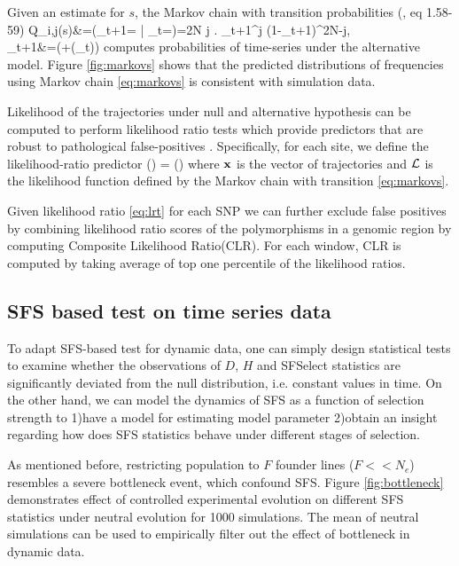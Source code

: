 \documentclass[11pt]{article}
\begin{document}
Given an estimate for $s$, the Markov chain with transition 
probabilities 
(\cite{Ewens2012Mathematical}, eq 1.58-59)
\beq
Q_{i,j}(s)&=\pr\left(\nu_{t+1}= \left| 
\nu_{t}=\right)={2N 
	\choose j} \right. 
\hat{\nu}_{t+1}^{j} (1-\hat{\nu}_{t+1})^{2N-j},\\
\hat{\nu}_{t+1}&=\sigma(+\eta(\nu_t))\label{eq:markovs}
\eeq
computes probabilities of time-series under the alternative 
model. Figure \ref{fig:markovs} shows that the predicted distributions of 
frequencies using Markov chain \ref{eq:markovs} is consistent with simulation 
data.

Likelihood of the trajectories under null and alternative 
hypothesis can be 
computed to perform likelihood ratio tests which provide 
predictors that are 
robust to pathological false-positives 
\cite{feder2014Identifying}. 
Specifically, for each site, we define the likelihood-ratio 
predictor
\beq \label{eq:lrt}
\Lambda() = \log 
\left(\right)
\eeq
where ${\mathbf x}$ is the vector of trajectories and ${\cal L}$ is the 
likelihood function 
defined by the Markov chain with transition 
\eqref{eq:markovs}.

Given likelihood ratio \eqref{eq:lrt} for each SNP we can further exclude false 
positives by combining likelihood ratio scores of the polymorphisms in a 
genomic region by computing Composite 
Likelihood 
Ratio(CLR)\cite{nielsen2005genomic,williamson2007localizing,vitti2013detecting}.
For each window, CLR is computed by taking average of top one percentile of the 
likelihood ratios.

\subsection{SFS based test on time series data}\label{sec:sfs-ts}
To adapt SFS-based test for dynamic data, one can simply design statistical 
tests to examine whether the 
observations of $D$, $H$ and SFSelect statistics are 
significantly deviated 
from the null distribution, i.e. constant values in time.
On the other hand, we can model the dynamics of SFS as a 
function of selection 
strength to 1)have a model for estimating model parameter 2)obtain an insight 
regarding how does SFS statistics behave under different 
stages of selection.

As mentioned before, restricting population to $F$ founder lines ($F<<N_e$) 
resembles a severe bottleneck event, which confound SFS. Figure 
\ref{fig:bottleneck} demonstrates effect of controlled experimental evolution 
on different SFS statistics under neutral evolution for 1000 simulations. The 
mean of 
neutral simulations can be used to empirically filter out the effect of 
bottleneck in dynamic data. 
\end{document}
